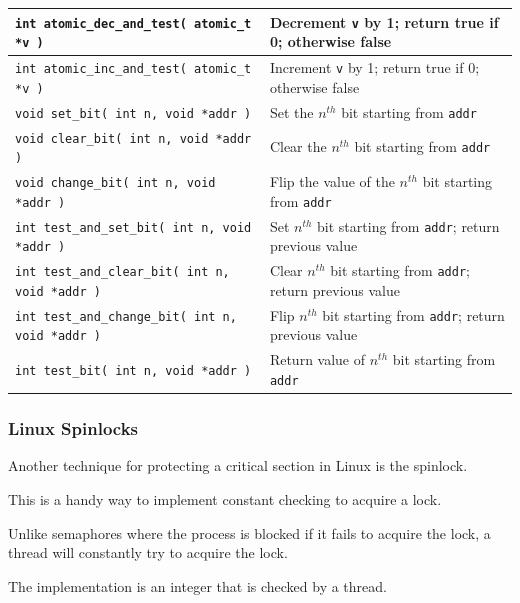 \begin{frame}
{\begin{center}
\begin{tabular}{l|l}
\texttt{int atomic\_dec\_and\_test( atomic\_t *v )} & Decrement \texttt{v} by 1; return true if 0; otherwise false\\\hline

\texttt{int atomic\_inc\_and\_test( atomic\_t *v )} & Increment \texttt{v} by 1; return true if 0; otherwise false\\ \hline\hline

\texttt{void set\_bit( int n, void *addr )} &  Set the $n^{th}$ bit starting from \texttt{addr}\\\hline

\texttt{void clear\_bit( int n, void *addr )} &  Clear the $n^{th}$ bit starting from \texttt{addr}\\\hline

\texttt{void change\_bit( int n, void *addr )} &  Flip the value of the $n^{th}$ bit starting from \texttt{addr}\\\hline

\texttt{int test\_and\_set\_bit( int n, void *addr )} &  Set $n^{th}$ bit starting from \texttt{addr}; return previous value\\\hline

\texttt{int test\_and\_clear\_bit( int n, void *addr )} &  Clear $n^{th}$ bit starting from \texttt{addr}; return previous value\\\hline

\texttt{int test\_and\_change\_bit( int n, void *addr )} &  Flip $n^{th}$ bit starting from \texttt{addr}; return previous value\\\hline

\texttt{int test\_bit( int n, void *addr )} &  Return value of $n^{th}$ bit starting from \texttt{addr}\\\hline

\end{tabular}
\end{center}
}

\end{frame}

\begin{frame}
\frametitle{Linux Spinlocks}

Another technique for protecting a critical section in Linux is the \alert{spinlock}. 

This is a handy way to implement constant checking to acquire a lock.

Unlike semaphores where the process is blocked if it fails to acquire the lock, a thread will constantly try to acquire the lock. 

The implementation is an integer that is checked by a thread.

\end{frame}


